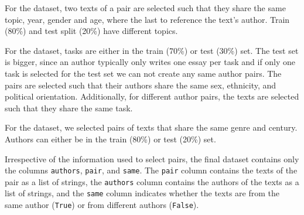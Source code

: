 \begin{table}[h]
\centering\small
\caption{Statistics of preprocessed datasets \dataPan{}, \dataBlog{}, \dataGutenberg{}, and \dataStudent{}.}
\label{tab:data_stats}
\end{table}

For the \dataBlog{} dataset, 
two texts of a pair are selected such that they share the same topic, year, gender and age, where the last to reference the text's author.
Train (80\%) and test split (20\%) have different topics.

For the \dataStudent{} dataset,
tasks are either in the train (70\%) or test (30\%) set.
The test set is bigger, since an author typically only writes one essay per task and if only one task is selected for the test set we can not create any same author pairs.
The pairs are selected such that their authors share the same sex, ethnicity, and political orientation.
Additionally, for different author pairs, the texts are selected such that they share the same task.

For the \dataGutenberg{} dataset,
we selected pairs of texts that share the same genre and century.
Authors can either be in the train (80\%) or test (20\%) set.

Irrespective of the information used to select pairs, the final dataset contains only the columns \texttt{authors}, \texttt{pair}, and \texttt{same}.
The \texttt{pair} column contains the texts of the pair as a list of strings,
the \texttt{authors} column contains the authors of the texts as a list of strings,
and the \texttt{same} column indicates whether the texts are from the same author (\texttt{True}) or from different authors (\texttt{False}).
